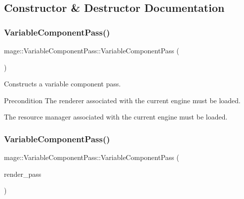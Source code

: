 \subsection{Constructor \& Destructor Documentation}
\hypertarget{classmage_1_1_variable_component_pass_a86224a1702761665451b3c6e78557261}{}\label{classmage_1_1_variable_component_pass_a86224a1702761665451b3c6e78557261} 
\subsubsection{\texorpdfstring{Variable\+Component\+Pass()}{VariableComponentPass()}\hspace{0.1cm}{\footnotesize\ttfamily [1/3]}}
{\footnotesize\ttfamily mage\+::\+Variable\+Component\+Pass\+::\+Variable\+Component\+Pass (\begin{DoxyParamCaption}{ }\end{DoxyParamCaption})}

Constructs a variable component pass.

\begin{DoxyPrecond}{Precondition}
The renderer associated with the current engine must be loaded. 

The resource manager associated with the current engine must be loaded. 
\end{DoxyPrecond}
\hypertarget{classmage_1_1_variable_component_pass_a535ac4989db673e69870090494f454dd}{}\label{classmage_1_1_variable_component_pass_a535ac4989db673e69870090494f454dd} 
\subsubsection{\texorpdfstring{Variable\+Component\+Pass()}{VariableComponentPass()}\hspace{0.1cm}{\footnotesize\ttfamily [2/3]}}
{\footnotesize\ttfamily mage\+::\+Variable\+Component\+Pass\+::\+Variable\+Component\+Pass (\begin{DoxyParamCaption}\item[{const \hyperlink{classmage_1_1_variable_component_pass}{Variable\+Component\+Pass} \&}]{render\+\_\+pass }\end{DoxyParamCaption})\hspace{0.3cm}{\ttfamily [delete]}}

